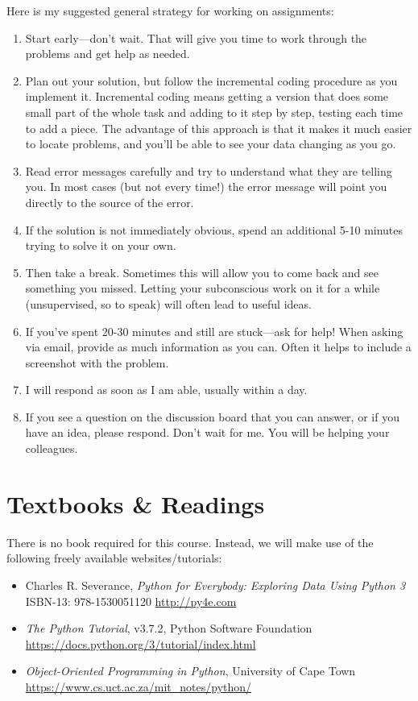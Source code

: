 \documentclass[11pt]{article}
\begin{document}
Here is my suggested general strategy for working on assignments:
\begin{enumerate}
	\item Start early---don't wait. That will give you time to work through the problems and get help as needed.
	\item Plan out your solution, but follow the incremental coding procedure as you implement it.  Incremental coding means getting a version that does some small part of the whole task and adding to it step by step, testing each time to add a piece. The advantage of this approach is that it makes it much easier to locate problems, and you'll be able to see your data changing as you go.
	\item Read error messages carefully and try to understand what they are telling you. In most cases (but not every time!) the error message will point you directly to the source of the error. 
	\item If the solution is not immediately obvious, spend an additional 5-10 minutes trying to solve it on your own.
	\item Then take a break. Sometimes this will allow you to come back and see something you missed. Letting your subconscious work on it for a while (unsupervised, so to speak) will often lead to useful ideas.
	\item If you’ve spent 20-30 minutes and still are stuck---ask for help! When asking via email, provide as much information as you can. Often it helps to include a screenshot with the problem.
	\item I will respond as soon as I am able, usually within a day.
	\item If you see a question on the discussion board that you can answer, or if you have an idea, please respond. Don’t wait for me. You will be helping your colleagues.
\end{enumerate}

\section{Textbooks \& Readings}
There is no book required for this course. Instead, we will make use of the following freely available websites/tutorials:
\begin{itemize}
	\item Charles R. Severance, \textit{Python for Everybody: Exploring Data Using Python 3} ISBN-13: 978-1530051120 \url{http://py4e.com}
	\item \textit{The Python Tutorial}, v3.7.2, Python Software Foundation \url{https://docs.python.org/3/tutorial/index.html}
	\item \textit{Object-Oriented Programming in Python}, University of Cape Town \url{https://www.cs.uct.ac.za/mit_notes/python/}
\end{itemize}
\end{document}
